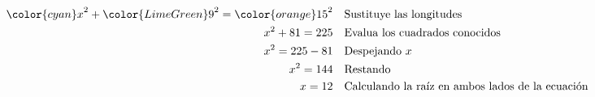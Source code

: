 \begin{minipage}[t][][t]{0.6\textwidth}
\begin{solutionbox}{9.5cm}
\begin{align*}
            {\color{cyan}x}^2+{\color{LimeGreen}9}^2  ={\color{orange}15}^2 & \text{\quad Sustituye las longitudes}                         \\
            x^2+81   =225                                                   & \text{\quad Evalua los cuadrados conocidos}                   \\
            x^2=225-81                                                      & \text{\quad Despejando } x                                    \\
            x^2=144                                                         & \text{\quad Restando}                                         \\
            x=12                                                            & \text{\quad Calculando la raíz en ambos lados de la ecuación} \\
        \end{align*}
    \end{solutionbox}
\end{minipage}
